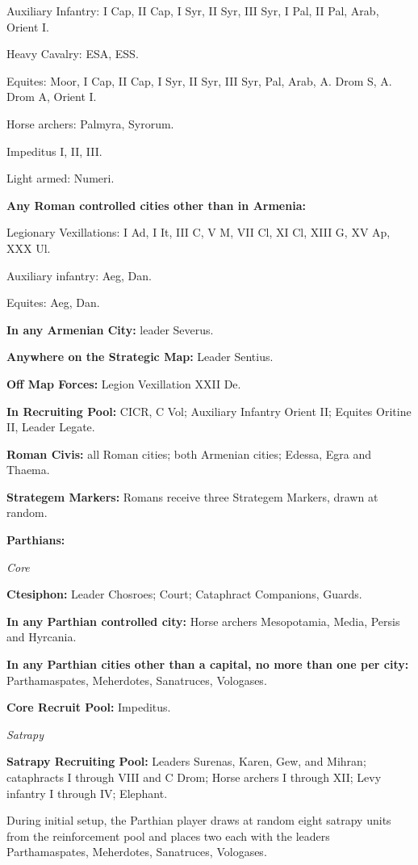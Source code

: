 Auxiliary Infantry: I Cap, II Cap, I Syr, II Syr, III Syr, I Pal, II Pal, Arab, Orient I.

Heavy Cavalry: ESA, ESS.

Equites: Moor, I Cap, II Cap, I Syr, II Syr, III Syr, Pal, Arab, A. Drom S, A. Drom A, Orient I.

Horse archers: Palmyra, Syrorum.

Impeditus I, II, III.

Light armed: Numeri.

\textbf{Any Roman controlled cities other than in Armenia:}

Legionary Vexillations: I Ad, I It, III C, V M, VII Cl, XI Cl, XIII G, XV Ap, XXX Ul.

Auxiliary infantry: Aeg, Dan.

Equites: Aeg, Dan.

\textbf{In any Armenian City:} leader Severus.

\textbf{Anywhere on the Strategic Map:} Leader Sentius.

\textbf{Off Map Forces:} Legion Vexillation XXII De.

\textbf{In Recruiting Pool:} CICR, C Vol; Auxiliary Infantry Orient II; Equites Oritine II, Leader Legate.

\textbf{Roman Civis:} all Roman cities; both Armenian cities; Edessa, Egra and Thaema.

\textbf{Strategem Markers:} Romans receive three Strategem Markers, drawn at random.

\textbf{Parthians:}

\textit{Core}

\textbf{Ctesiphon:} Leader Chosroes; Court; Cataphract Companions, Guards.

\textbf{In any Parthian controlled city:} Horse archers Mesopotamia, Media, Persis and Hyrcania.

\textbf{In any Parthian cities other than a capital, no more than one per city:} Parthamaspates, Meherdotes, Sanatruces, Vologases.

\textbf{Core Recruit Pool:} Impeditus.

\textit{Satrapy}

\textbf{Satrapy Recruiting Pool:} Leaders Surenas, Karen, Gew, and Mihran; cataphracts I through VIII and C Drom; Horse archers I through XII; Levy infantry I through IV; Elephant.

During initial setup, the Parthian player draws at random eight satrapy units from the reinforcement pool and places two each with the leaders Parthamaspates, Meherdotes, Sanatruces, Vologases.

